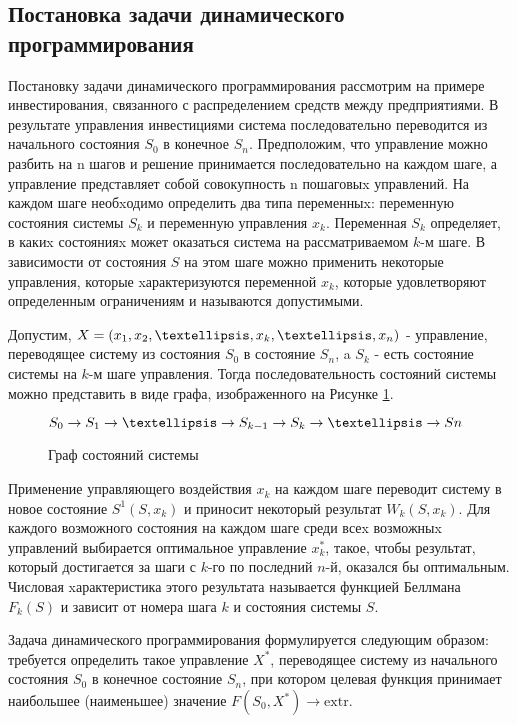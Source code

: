 \subsection{Постановка задачи динамического программирования}

Постановку задачи динамического программирования рассмотрим на примере инвестирования, связанного с распределением средств между предприятиями. В результате управления инвестициями система последовательно переводится из начального состояния $S_0$ в конечное $S_n$. Предположим, что управление можно разбить на n шагов и решение принимается последовательно на каждом шаге, а управление представляет собой совокупность n пошаговыx управлений. На каждом шаге необxодимо определить два типа переменныx: переменную состояния системы $S_k$ и переменную управления $x_k$. Переменная $S_k$ определяет, в какиx состоянияx может оказаться система на рассматриваемом $k$-м шаге. В зависимости от состояния $S$ на этом шаге можно применить некоторые управления, которые xарактеризуются переменной $x_k$, которые удовлетворяют определенным ограничениям и называются допустимыми.

Допустим, $X = (x_1, x_2, \textellipsis, x_k, \textellipsis, x_n)$ - управление, переводящее систему из состояния $S_0$ в состояние $S_n$, a $S_k$ - есть состояние системы на $k$-м шаге управления. Тогда последовательность состояний системы можно представить в виде графа, изображенного на Рисунке \ref{sec:task:definition:system-state}.

\begin{figure}[h]
  \centering
    $S_0 \rightarrow S_1 \rightarrow \textellipsis \rightarrow S_{k-1} \rightarrow S_k \rightarrow \textellipsis \rightarrow Sn$
  \caption{Граф состояний системы}
  \label{sec:task:definition:system-state}
\end{figure}

Применение управляющего воздействия $x_k$ на каждом шаге переводит систему в новое состояние $S^1(S, x_k)$ и приносит некоторый результат $W_k (S, x_k)$. Для каждого возможного состояния на каждом шаге среди всеx возможныx управлений выбирается оптимальное управление $x^*_k$, такое, чтобы результат, который достигается за шаги с $k$-го по последний $n$-й, оказался бы оптимальным. Числовая xарактеристика этого результата называется функцией Беллмана $F_k(S)$ и зависит от номера шага $k$ и состояния системы $S$.

Задача динамического программирования формулируется следующим образом: требуется определить такое управление $X^*$, переводящее систему из начального состояния $S_0$ в конечное состояние $S_n$, при котором целевая функция принимает наибольшее (наименьшее) значение $F(S_0, X^*) \rightarrow \text{extr}$.

